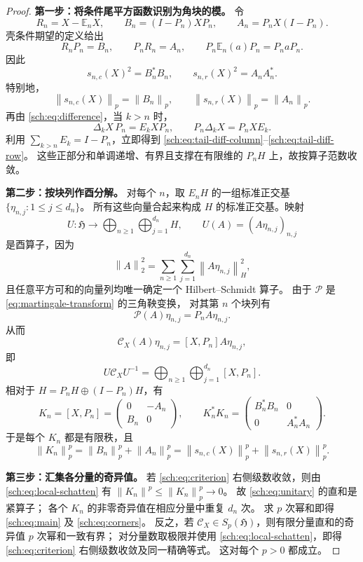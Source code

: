 \documentclass[UTF8,11pt,a4paper,fontset=fandol]{ctexart}
\theoremstyle{remark}
\newcommand{\PP}{\mathcal P}
\newcommand{\CC}{\mathcal C}
\newcommand{\norm}[1]{\left\lVert #1\right\rVert}
\newcommand{\HS}{\mathfrak H}
\numberwithin{equation}{section}
\begin{document}
\begin{proof}
\textbf{第一步：将条件尾平方函数识别为角块的模。}
令
\[
 R_n=X-\mathbb E_nX,\qquad
 B_n=(I-P_n)XP_n,\qquad A_n=P_nX(I-P_n).
\]
壳条件期望的定义给出
\[
 R_nP_n=B_n,\qquad P_nR_n=A_n,
 \qquad P_n\mathbb E_n(a)P_n=P_naP_n.
\]
因此
\begin{equation}\label{sch:eq:tail-moduli}
 s_{n,c}(X)^2=B_n^*B_n,\qquad
 s_{n,r}(X)^2=A_nA_n^*.
\end{equation}
特别地，
\[
 \norm{s_{n,c}(X)}_p=\norm{B_n}_p,
 \qquad \norm{s_{n,r}(X)}_p=\norm{A_n}_p.
\]
再由 \eqref{sch:eq:difference}，当 $k>n$ 时，
\[
 \Delta_kX\,P_n=E_kXP_n,\qquad
 P_n\Delta_kX=P_nXE_k.
\]
利用 $\sum_{k>n}E_k=I-P_n$，立即得到
\eqref{sch:eq:tail-diff-column}--\eqref{sch:eq:tail-diff-row}。
这些正部分和单调递增、有界且支撑在有限维的 $P_nH$ 上，故按算子范数收敛。

\medskip
\textbf{第二步：按块列作酉分解。}
对每个 $n$，取 $E_nH$ 的一组标准正交基
$\{\eta_{n,j}:1\leq j\leq d_n\}$。
所有这些向量合起来构成 $H$ 的标准正交基。映射
\[
 U:\HS\longrightarrow\bigoplus_{n\geq1}\bigoplus_{j=1}^{d_n}H,
 \qquad U(A)=(A\eta_{n,j})_{n,j}
\]
是酉算子，因为
\[
 \norm A_2^2=\sum_{n\geq1}\sum_{j=1}^{d_n}\norm{A\eta_{n,j}}_H^2,
\]
且任意平方可和的向量列均唯一确定一个 Hilbert--Schmidt 算子。
由于 $\PP$ 是 \eqref{eq:martingale-transform} 的三角鞅变换，
对其第 $n$ 个块列有
\[
 \PP(A)\eta_{n,j}=P_nA\eta_{n,j}.
\]
从而
\[
 \CC_X(A)\eta_{n,j}=[X,P_n]A\eta_{n,j},
\]
即
\begin{equation}\label{sch:eq:unitary}
 \boxed{\quad
 U\CC_XU^{-1}
 =\bigoplus_{n\geq1}\bigoplus_{j=1}^{d_n}[X,P_n].
 \quad}
\end{equation}
相对于 $H=P_nH\oplus(I-P_n)H$，有
\[
 K_n=[X,P_n]=\begin{pmatrix}0&-A_n\\B_n&0\end{pmatrix},
 \qquad
 K_n^*K_n=\begin{pmatrix}B_n^*B_n&0\\0&A_n^*A_n\end{pmatrix}.
\]
于是每个 $K_n$ 都是有限秩，且
\begin{equation}\label{sch:eq:local-schatten}
 \norm{K_n}_p^p
 =\norm{B_n}_p^p+\norm{A_n}_p^p
 =\norm{s_{n,c}(X)}_p^p+\norm{s_{n,r}(X)}_p^p.
\end{equation}

\medskip
\textbf{第三步：汇集各分量的奇异值。}
若 \eqref{sch:eq:criterion} 右侧级数收敛，则由
\eqref{sch:eq:local-schatten} 有 $\norm{K_n}^p\leq\norm{K_n}_p^p\to0$。
故 \eqref{sch:eq:unitary} 的直和是紧算子；
各个 $K_n$ 的非零奇异值在相应分量中重复 $d_n$ 次。
求 $p$ 次幂和即得 \eqref{sch:eq:main} 及 \eqref{sch:eq:corners}。
反之，若 $\CC_X\in S_p(\HS)$，则有限分量直和的奇异值 $p$ 次幂和一致有界；
对分量数取极限并使用 \eqref{sch:eq:local-schatten}，即得
\eqref{sch:eq:criterion} 右侧级数收敛及同一精确等式。
这对每个 $p>0$ 都成立。
\end{proof}
\end{document}
